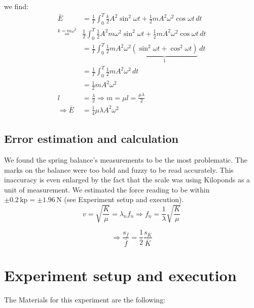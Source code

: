 \documentclass{scrreprt}
\newcommand{\unit}[1]{\ensuremath{\, \mathrm{#1}}}
\begin{document}
we find:
\begin{align}
\bar{E} &= \frac{1}{T} \int_0^T{\frac{k}{2} A^2 \sin^2{\omega t} + \frac{1}{2} m A^2 \omega^2 \cos{\omega t}}\,dt\\
\stackrel{k=m\omega^2}{=}& \frac{1}{T} \int_0^T{\frac{1}{2} A^2 m \omega^2 \sin^2{\omega t} + \frac{1}{2} m A^2 \omega^2 \cos{\omega t}} \,dt\\
&= \frac{1}{T}\int_0^T{\frac{1}{2} m A^2 \omega^2 \underbrace{(\sin^2{\omega t}+\cos^2{\omega t})}_{1} } \,dt\\
& = \frac{1}{T}\int_0^T \! \frac{1}{2}mA^2\omega^2 \, dt\\
& =\frac{1}{2}mA^2\omega^2\\
l &= \frac{\lambda}{2} \Rightarrow m = \mu l = \frac{\mu \lambda}{2}\\ 
\Rightarrow \bar{E} &= \frac{1}{4}\mu \lambda A^2\omega^2
\end{align}

\subsection{Error estimation and calculation}
We found the spring balance's measurements to be the most problematic. The marks on the balance were too bold and fuzzy to be read accurately. This inaccuracy is even enlarged by the fact that the scale was using Kiloponds as a unit of measurement. We estimated the force reading to be within $\pm 0.2\unit{kp} = \pm 1.96 \unit{N}$ (see Experiment setup and execution).\\

\begin{equation}
v = \sqrt{\frac{K}{\mu}} = \lambda_n f_n \Rightarrow f_n = \frac{1}{\lambda} \sqrt{\frac{K}{\mu}} 
\end{equation}

\begin{equation}
\Rightarrow \frac{s_{\bar{f}}}{\bar{f}} = \frac{1}{2} \frac{s_{\overline{K}}}{\overline{K}}
\end{equation}

\section{Experiment setup and execution}
The Materials for this experiment are the following: 
\end{document}
